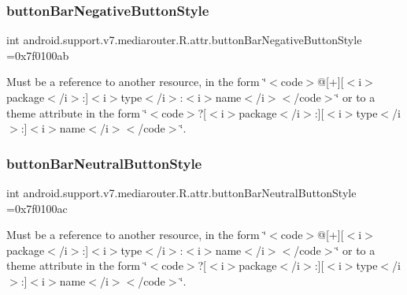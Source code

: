\subsubsection{\texorpdfstring{button\+Bar\+Negative\+Button\+Style}{buttonBarNegativeButtonStyle}}
{\footnotesize\ttfamily int android.\+support.\+v7.\+mediarouter.\+R.\+attr.\+button\+Bar\+Negative\+Button\+Style =0x7f0100ab\hspace{0.3cm}{\ttfamily [static]}}

Must be a reference to another resource, in the form \char`\"{}$<$code$>$@\mbox{[}+\mbox{]}\mbox{[}$<$i$>$package$<$/i$>$\+:\mbox{]}$<$i$>$type$<$/i$>$\+:$<$i$>$name$<$/i$>$$<$/code$>$\char`\"{} or to a theme attribute in the form \char`\"{}$<$code$>$?\mbox{[}$<$i$>$package$<$/i$>$\+:\mbox{]}\mbox{[}$<$i$>$type$<$/i$>$\+:\mbox{]}$<$i$>$name$<$/i$>$$<$/code$>$\char`\"{}. \mbox{\label{classandroid_1_1support_1_1v7_1_1mediarouter_1_1R_1_1attr_a8980e0e83b1fb7c718436d854918c903}} 
\subsubsection{\texorpdfstring{button\+Bar\+Neutral\+Button\+Style}{buttonBarNeutralButtonStyle}}
{\footnotesize\ttfamily int android.\+support.\+v7.\+mediarouter.\+R.\+attr.\+button\+Bar\+Neutral\+Button\+Style =0x7f0100ac\hspace{0.3cm}{\ttfamily [static]}}

Must be a reference to another resource, in the form \char`\"{}$<$code$>$@\mbox{[}+\mbox{]}\mbox{[}$<$i$>$package$<$/i$>$\+:\mbox{]}$<$i$>$type$<$/i$>$\+:$<$i$>$name$<$/i$>$$<$/code$>$\char`\"{} or to a theme attribute in the form \char`\"{}$<$code$>$?\mbox{[}$<$i$>$package$<$/i$>$\+:\mbox{]}\mbox{[}$<$i$>$type$<$/i$>$\+:\mbox{]}$<$i$>$name$<$/i$>$$<$/code$>$\char`\"{}. \mbox{\label{classandroid_1_1support_1_1v7_1_1mediarouter_1_1R_1_1attr_ad2375a05daf039b06d6814c9e5ef3aaf}} 
